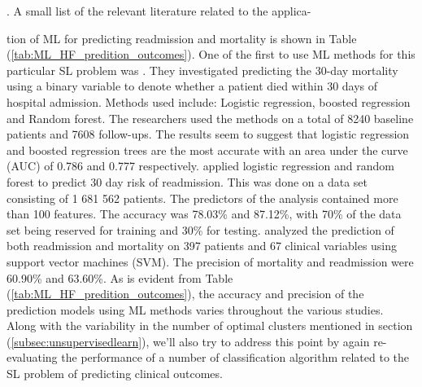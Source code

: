 \documentclass[../thesis.tex]{subfiles}
\begin{document}
\citep{ketchum2011multivariate}. A small list of the relevant literature related to the applica-



\noindent tion of ML for predicting readmission and mortality is shown in Table (\ref{tab:ML_HF_predition_outcomes}). One of the first to use ML methods for this particular SL problem was \cite{austin2012regression}. They investigated predicting the 30-day mortality using a binary variable to denote whether a patient died within 30 days of hospital admission. Methods used include: Logistic regression, boosted regression and Random forest. The researchers used the methods on a total of 8240 baseline patients and 7608 follow-ups. The results seem to suggest that logistic regression and boosted regression trees are the most accurate with an area under the curve (AUC) of 0.786 and 0.777 respectively. \cite{zolfaghar2013big} applied logistic regression and random forest to predict 30 day risk of readmission. This was done on a data set consisting of 1 681 562 patients. The predictors of the analysis contained more than 100 features. The accuracy was 78.03\% and 87.12\%, with 70\% of the data set being reserved for training and 30\% for testing. \cite{shah2014phenomapping} analyzed the prediction of both readmission and mortality on 397 patients and 67 clinical variables using support vector machines (SVM). The precision of mortality and readmission were 60.90\% and 63.60\%. As is evident from Table (\ref{tab:ML_HF_predition_outcomes}), the accuracy and precision of the prediction models using ML methods varies throughout the various studies. Along with the variability in the number of optimal clusters mentioned in section (\ref{subsec:unsupervisedlearn}), we'll also try to address this point by again re-evaluating the performance of a number of classification algorithm related to the SL problem of predicting clinical outcomes. 
\end{document}
